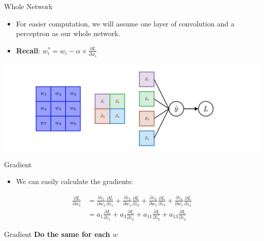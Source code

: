 \documentclass[default, aspectratio=169]{beamer}
\begin{document}
	\begin{frame}{Whole Network}
		\begin{itemize}
			\item For easier computation, we will assume one layer of convolution and a perceptron as our whole network.
			\item \textbf{Recall}: \(w_i^* = w_i - \alpha \times \frac{\partial L}{\partial w_i}\)
		\end{itemize}
		\smallskip
		\centering
		\includegraphics[keepaspectratio, scale=0.25]{pic/BP6.png}
	\end{frame}
	
	
	\begin{frame}{Gradient}
		\begin{itemize}
			\item We can easily calculate the gradients:  
		\end{itemize}
		\smallbreak
		\begin{align*}
			\frac{\partial L}{\partial w_1} &= \frac{\partial z_1}{\partial w_1} \frac{\partial L}{\partial z_1} + \frac{\partial z_2}{\partial w_1} \frac{\partial L}{\partial z_2} + \frac{\partial z_3}{\partial w_1} \frac{\partial L}{\partial z_3} + \frac{\partial z_4}{\partial w_1} \frac{\partial L}{\partial z_4} \\
			&= a_1 \frac{\partial L}{\partial z_1} + a_3 \frac{\partial L}{\partial z_2} + a_{11} \frac{\partial L}{\partial z_3} + a_{13} \frac{\partial L}{\partial z_4}
		\end{align*}
		
	\end{frame}
	
	\begin{frame}{Gradient}
		\centering \large \textbf{Do the same for each $w$}
	\end{frame}
	
\end{document}
